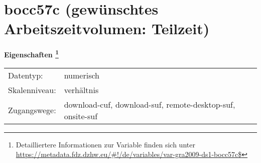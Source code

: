
    \setcounter{footnote}{0}

    \vspace*{-1.8cm}
	\section{bocc57c (gewünschtes Arbeitszeitvolumen: Teilzeit)}
	\label{section:bocc57c}



    \vspace*{0.5cm}
    \noindent\textbf{Eigenschaften
	\footnote{Detailliertere Informationen zur Variable finden sich unter
		\url{https://metadata.fdz.dzhw.eu/\#!/de/variables/var-gra2009-ds1-bocc57c$}}}\\
	\begin{tabularx}{\hsize}{@{}lX}
	Datentyp: & numerisch \\
	Skalenniveau: & verhältnis \\
	Zugangswege: &
	  download-cuf, 
	  download-suf, 
	  remote-desktop-suf, 
	  onsite-suf
 \\
    \end{tabularx}



